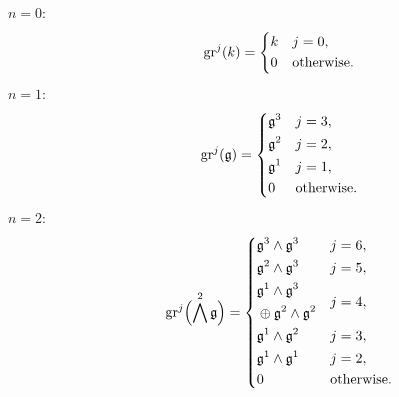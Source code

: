 \begin{description}
  \item[$n=0:$]
        \begin{equation*}
          \operatorname{gr}^{j}(k) =
          \begin{dcases}
            k & j=0, \\
            0 & \text{otherwise.}
          \end{dcases}
        \end{equation*}

   \item[$n=1:$]
        \begin{equation*}
          \operatorname{gr}^{j}(\mathfrak{g}) =
          \begin{dcases}
            \mathfrak{g}^{3} & j=3, \\
            \mathfrak{g}^{2} & j=2, \\
            \mathfrak{g}^{1} & j=1, \\
            0          & \text{otherwise.}
          \end{dcases}
        \end{equation*}

  \item[$n=2:$]
        \begin{equation*}
          \operatorname{gr}^{j}\Bigl( \bigwedge^{2}\mathfrak{g} \Bigr) =
          \begin{dcases}
            \mathfrak{g}^{3} \wedge \mathfrak{g}^{3} & j=6,                                                                             \\
            \mathfrak{g}^{2} \wedge \mathfrak{g}^{3} & j=5,                                                                             \\
            \!\begin{aligned} & \mathfrak{g}^{1} \wedge \mathfrak{g}^{3} \\ & \oplus \mathfrak{g}^{2} \wedge \mathfrak{g}^{2} \end{aligned} & j=4, \\
            \mathfrak{g}^{1} \wedge \mathfrak{g}^{2}                                                                             & j=3, \\
            \mathfrak{g}^{1} \wedge \mathfrak{g}^{1}                                                                             & j=2, \\
            0                                                                                                         & \text{otherwise.}
          \end{dcases}
        \end{equation*}


\end{description}
